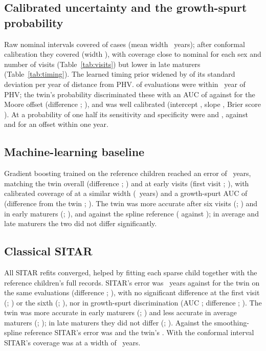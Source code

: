 \documentclass[journal]{IEEEtran}
\begin{document}
\subsection{Calibrated uncertainty and the growth-spurt probability}
Raw nominal \SpecInterval{} intervals covered \TwCovRaw{} of cases (mean width \TwWidthRaw{}~years);
after conformal calibration they covered \TwCovConf{} (width \TwWidthConf{}), with coverage close to
nominal for each sex and number of visits (Table~\ref{tab:visits}) but lower in late maturers
(Table~\ref{tab:timing}). The learned timing prior widened by \TwSlope{} of its standard deviation
per year of distance from PHV. \TwCircaPrev{} of evaluations were within \SpecCircaWidth{}~year of
PHV; the twin's probability discriminated these with an AUC of \TwCircaAUC{} against
\TwCircaAUCMoore{} for the Moore offset (difference \TwDiffAUC{}; \TwDiffAUCCI{}), and was well
calibrated (intercept \CircaIntercept{}, slope \CircaSlope{}, Brier score \CircaBrier{}). At a
probability of one half its sensitivity and specificity were \TwCircaSensTwin{} and
\TwCircaSpecTwin{}, against \TwCircaSensMoore{} and \TwCircaSpecMoore{} for an offset within one year.

\subsection{Machine-learning baseline}
Gradient boosting trained on the reference children reached an error of \MlMAE{}~years, matching the
twin overall (difference \TwDiffML{}; \TwDiffMLCI{}) and at early visits (first visit \TwDiffMLFirst{};
\TwDiffMLFirstCI{}), with calibrated coverage of \MlCov{} at a similar width (\MlWidth{}~years) and a
growth-spurt AUC of \MlAUC{} (difference from the twin \TwDiffMLAUC{}; \TwDiffMLAUCCI{}). The twin was
more accurate after six visits (\TwDiffMLLast{}; \TwDiffMLLastCI{}) and in early maturers
(\TwEarlyDiffML{}; \TwEarlyDiffMLCI{}), and against the spline reference (\SplineTwin{} against
\SplineML{}); in average and late maturers the two did not differ significantly.

\subsection{Classical SITAR}
All \SitarRows{} SITAR refits converged, helped by fitting each sparse child
together with the reference children's full records. SITAR's error was \SitarMAE{}~years against
\SitarTwinSame{} for the twin on the same evaluations (difference \TwDiffSitar{}; \TwDiffSitarCI{}),
with no significant difference at the first visit (\TwDiffSitarFirst{}; \TwDiffSitarFirstCI{}) or
the sixth (\TwDiffSitarLast{}; \TwDiffSitarLastCI{}), nor in growth-spurt discrimination (AUC
\SitarAUC{}; difference \TwDiffSitarAUC{}; \TwDiffSitarAUCCI{}). The twin was more accurate in
early maturers (\TwEarlyDiffSitar{}; \TwEarlyDiffSitarCI{}) and less accurate in average maturers
(\TwAverageDiffSitar{}; \TwAverageDiffSitarCI{}); in late maturers they did not differ
(\TwLateDiffSitar{}; \TwLateDiffSitarCI{}). Against the smoothing-spline reference SITAR's error
was \SplineSitar{} and the twin's \SplineTwinSitarRows{}. With the conformal interval SITAR's
coverage was \SitarCov{} at a width of \SitarWidth{}~years.
\end{document}

